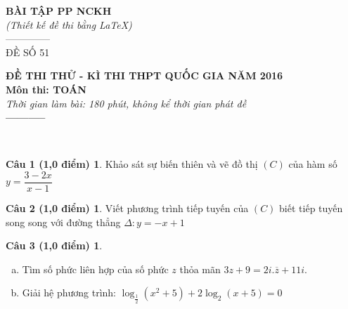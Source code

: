 \documentclass[12pt,a4paper,openany]{book}
\theoremstyle{definition}
\newtheorem*{cau1}{Câu 1 (1,0 điểm)}
\newtheorem*{cau2}{Câu 2 (1,0 điểm)}
\newtheorem*{cau3}{Câu 3 (1,0 điểm)}
\begin{document}
\thispagestyle{empty}
\begin{minipage}{0.3\textwidth}
	\begin{flushleft}
		\begin{center}
			\textbf{BÀI TẬP PP NCKH}\\
			\textit{(Thiết kế đề thi bằng \LaTeX)}\\
			--------------\\
			ĐỀ SỐ 51
		\end{center}
	\end{flushleft}
\end{minipage}
\begin{minipage}{0.7\textwidth}
	\begin{center}
		\textbf{ĐỀ THI THỬ - KÌ THI THPT QUỐC GIA NĂM 2016}\\
		\textbf{Môn thi: TOÁN}\\
		\textit{Thời gian làm bài: 180 phút, không kể thời gian phát đề}\\
		\textbf{-----------}
	\end{center}
\end{minipage}

~\\

\begin{cau1} Khảo sát sự biến thiên và vẽ đồ thị $(C)$ của hàm số $y=\dfrac{3-2x}{x-1}$
\end{cau1}

\begin{cau2} Viết phương trình tiếp tuyến của $(C)$ biết tiếp tuyến song song với đường thẳng $\Delta: y=-x+1$\\[-10pt]
\end{cau2}

\begin{cau3}~
	\begin{enumerate}[a)]
		\item Tìm số phức liên hợp của số phức $z$ thỏa mãn $3z+9=2i.\overline{z}+11i$.
		\item Giải hệ phương trình: $\log_{\frac{1}{2}} (x^2+5)+2\log_2(x+5)=0$
	\end{enumerate}
\end{cau3}
\end{document}
